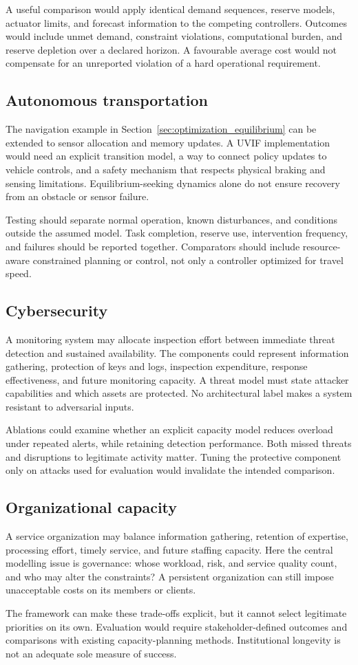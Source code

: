 A useful comparison would apply identical demand sequences, reserve models, actuator limits, and forecast information to the competing controllers. Outcomes would include unmet demand, constraint violations, computational burden, and reserve depletion over a declared horizon. A favourable average cost would not compensate for an unreported violation of a hard operational requirement.

\subsection{Autonomous transportation}
The navigation example in Section~\ref{sec:optimization_equilibrium} can be extended to sensor allocation and memory updates. A UVIF implementation would need an explicit transition model, a way to connect policy updates to vehicle controls, and a safety mechanism that respects physical braking and sensing limitations. Equilibrium-seeking dynamics alone do not ensure recovery from an obstacle or sensor failure.

Testing should separate normal operation, known disturbances, and conditions outside the assumed model. Task completion, reserve use, intervention frequency, and failures should be reported together. Comparators should include resource-aware constrained planning or control, not only a controller optimized for travel speed.

\subsection{Cybersecurity}
A monitoring system may allocate inspection effort between immediate threat detection and sustained availability. The components could represent information gathering, protection of keys and logs, inspection expenditure, response effectiveness, and future monitoring capacity. A threat model must state attacker capabilities and which assets are protected. No architectural label makes a system resistant to adversarial inputs.

Ablations could examine whether an explicit capacity model reduces overload under repeated alerts, while retaining detection performance. Both missed threats and disruptions to legitimate activity matter. Tuning the protective component only on attacks used for evaluation would invalidate the intended comparison.

\subsection{Organizational capacity}
A service organization may balance information gathering, retention of expertise, processing effort, timely service, and future staffing capacity. Here the central modelling issue is governance: whose workload, risk, and service quality count, and who may alter the constraints? A persistent organization can still impose unacceptable costs on its members or clients.

The framework can make these trade-offs explicit, but it cannot select legitimate priorities on its own. Evaluation would require stakeholder-defined outcomes and comparisons with existing capacity-planning methods. Institutional longevity is not an adequate sole measure of success.

